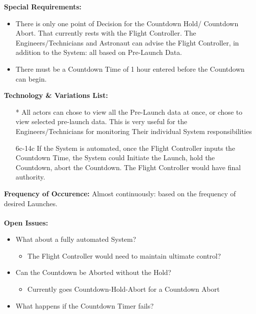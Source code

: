 \documentclass[letterpaper]{article}
\begin{document}
\textbf{Special Requirements: }
\begin{itemize}
\item There is only one point of Decision for the Countdown Hold/
Countdown Abort.  That currently rests with the Flight Controller.  The
Engineers/Technicians and Astronaut can advise the Flight Controller,
in addition to the System:  all based on Pre-Launch Data.
\item There must be a Countdown Time of 1 hour entered before the
Countdown can begin.
\end{itemize}
\textbf{Technology \& Variations List: }
\begin{itemize}
\item[*] All actors can chose to view all the Pre-Launch data at once,
or chose to view selected pre-launch data.  This is very useful for the
Engineers/Technicians for monitoring Their individual System
responsibilities
\item [6c-14c]If the System is automated, once the Flight Controller 
inputs the Countdown Time, the System could Initiate the Launch, 
hold the Countdown, abort the Countdown.  The Flight Controller would
have final authority.
\end{itemize}
\textbf{Frequency of Occurence:  }  Almost continuously:  based on the
frequency of desired Launches.\\\\
\textbf{Open Issues:  }
\begin{itemize}
\item What about a fully automated System?
\begin{itemize}
\item The Flight Controller would need to maintain ultimate control?
\end{itemize}
\item Can the Countdown be Aborted without the Hold?
\begin{itemize}
\item Currently goes Countdown-Hold-Abort for a Countdown Abort
\end{itemize}
\item What happens if the Countdown Timer fails?
\end{itemize}
\end{document}
